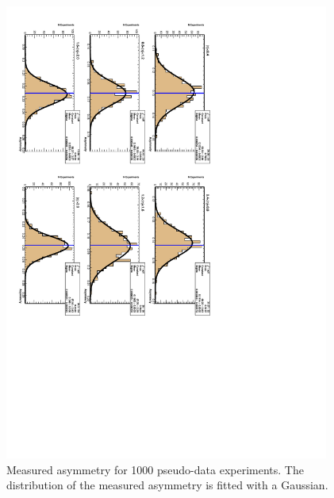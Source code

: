 \begin{figure}[htbp]
  \begin{center}
    \includegraphics*[angle=90,width=0.95\textwidth]{toyasym.pdf}
    \caption[Measured asymmetry for 1000 pseudo-data experiments.]
{\label{fig:toyasym}Measured asymmetry for 1000 pseudo-data experiments. The
distribution of the measured asymmetry is fitted with a
Gaussian\cite{baisini2010electron}.}
  \end{center}
\end{figure}


